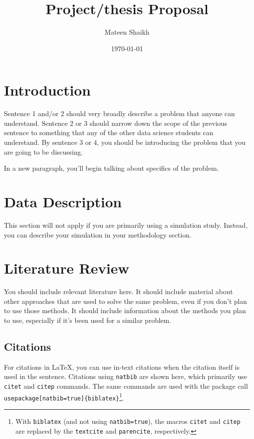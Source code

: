 \documentclass[12pt]{article}
\title{Project/thesis Proposal}
\author{Mateen Shaikh}
\date{\today}
\begin{document}
	
	\maketitle
	
	
	\section{Introduction}
	Sentence 1 and/or 2 should very broadly describe a problem that anyone can understand. Sentence 2 or 3 should narrow down the scope of the previous sentence to something that any of the other data science students can understand. By sentence 3 or 4, you should be introducing the problem that you are going to be discussing.
	
	In a new paragraph, you'll begin talking about specifics of the problem.
	
	\section{Data Description}
	
	This section will not apply if you are primarily using a simulation study. Instead, you can describe your simulation in your methodology section. 
	\section{Literature Review}
	
	You should include relevant literature here. It should include material about other approaches that are used to solve the same problem, even if you don't plan to use those methods. It should include information about the methods you plan to use, especially if it's been used for a similar problem.
	
	\subsection{Citations}
	For citations in \LaTeX, you can use in-text citations when the citation itself is used in the sentence. Citations using \texttt{natbib} are shown here, which primarily use \texttt{citet} and \texttt{citep} commands. The same commands are used with the package call \texttt{\\usepackage[natbib=true]\{biblatex\}}\footnote{With \texttt{biblatex} (and not using \texttt{natbib=true}), the macros \texttt{citet} and \texttt{citep} are replaced by the \texttt{textcite} and \texttt{parencite}, respectively.}.
	
\end{document}
